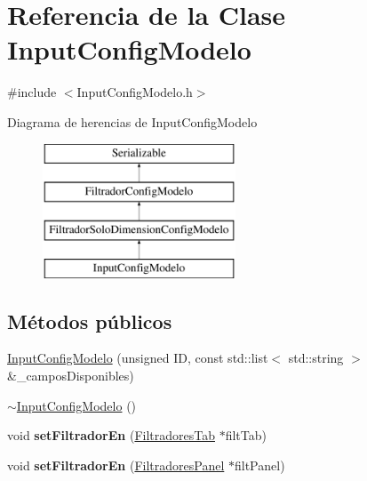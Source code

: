 \hypertarget{classInputConfigModelo}{\section{\-Referencia de la \-Clase \-Input\-Config\-Modelo}
\label{classInputConfigModelo}
}


{\ttfamily \#include $<$\-Input\-Config\-Modelo.\-h$>$}

\-Diagrama de herencias de \-Input\-Config\-Modelo\begin{figure}[H]
\begin{center}
\leavevmode
\includegraphics[height=4.000000cm]{classInputConfigModelo}
\end{center}
\end{figure}
\subsection*{\-Métodos públicos}
\begin{DoxyCompactItemize}
\item 
\hyperlink{classInputConfigModelo_a3c8191f6e7738641b7979df02ece471a}{\-Input\-Config\-Modelo} (unsigned \-I\-D, const std\-::list$<$ std\-::string $>$ \&\-\_\-campos\-Disponibles)
\item 
\hyperlink{classInputConfigModelo_a3a81ac4a041230e82e1a7bf42776dc5d}{$\sim$\-Input\-Config\-Modelo} ()
\item 
\hypertarget{classInputConfigModelo_ab217433ebe10462ad3faf554361af5e3}{void {\bfseries set\-Filtrador\-En} (\hyperlink{classFiltradoresTab}{\-Filtradores\-Tab} $\ast$filt\-Tab)}\label{classInputConfigModelo_ab217433ebe10462ad3faf554361af5e3}

\item 
\hypertarget{classInputConfigModelo_a3b00ce24fba77b1b5823099d1624c53d}{void {\bfseries set\-Filtrador\-En} (\hyperlink{classFiltradoresPanel}{\-Filtradores\-Panel} $\ast$filt\-Panel)}\label{classInputConfigModelo_a3b00ce24fba77b1b5823099d1624c53d}

\end{DoxyCompactItemize}


